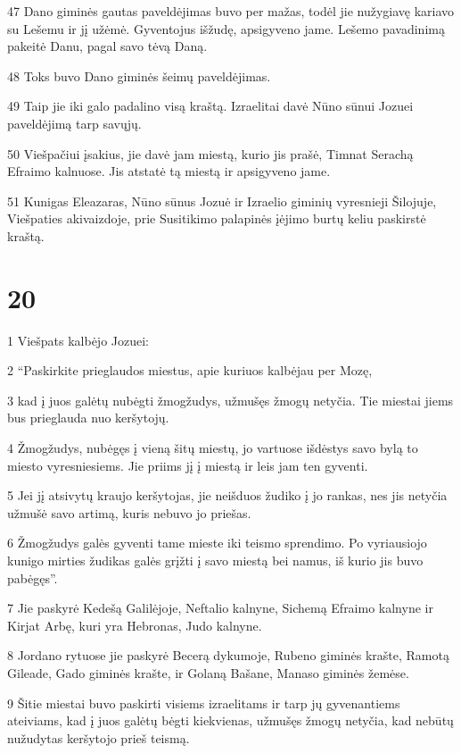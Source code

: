 \par 47 Dano giminės gautas paveldėjimas buvo per mažas, todėl jie nužygiavę kariavo su Lešemu ir jį užėmė. Gyventojus išžudę, apsigyveno jame. Lešemo pavadinimą pakeitė Danu, pagal savo tėvą Daną. 
\par 48 Toks buvo Dano giminės šeimų paveldėjimas. 
\par 49 Taip jie iki galo padalino visą kraštą. Izraelitai davė Nūno sūnui Jozuei paveldėjimą tarp savųjų. 
\par 50 Viešpačiui įsakius, jie davė jam miestą, kurio jis prašė, Timnat Serachą Efraimo kalnuose. Jis atstatė tą miestą ir apsigyveno jame. 
\par 51 Kunigas Eleazaras, Nūno sūnus Jozuė ir Izraelio giminių vyresnieji Šilojuje, Viešpaties akivaizdoje, prie Susitikimo palapinės įėjimo burtų keliu paskirstė kraštą.



\chapter{20}


\par 1 Viešpats kalbėjo Jozuei: 
\par 2 “Paskirkite prieglaudos miestus, apie kuriuos kalbėjau per Mozę, 
\par 3 kad į juos galėtų nubėgti žmogžudys, užmušęs žmogų netyčia. Tie miestai jiems bus prieglauda nuo keršytojų. 
\par 4 Žmogžudys, nubėgęs į vieną šitų miestų, jo vartuose išdėstys savo bylą to miesto vyresniesiems. Jie priims jį į miestą ir leis jam ten gyventi. 
\par 5 Jei jį atsivytų kraujo keršytojas, jie neišduos žudiko į jo rankas, nes jis netyčia užmušė savo artimą, kuris nebuvo jo priešas. 
\par 6 Žmogžudys galės gyventi tame mieste iki teismo sprendimo. Po vyriausiojo kunigo mirties žudikas galės grįžti į savo miestą bei namus, iš kurio jis buvo pabėgęs”. 
\par 7 Jie paskyrė Kedešą Galilėjoje, Neftalio kalnyne, Sichemą Efraimo kalnyne ir Kirjat Arbę, kuri yra Hebronas, Judo kalnyne. 
\par 8 Jordano rytuose jie paskyrė Becerą dykumoje, Rubeno giminės krašte, Ramotą Gileade, Gado giminės krašte, ir Golaną Bašane, Manaso giminės žemėse. 
\par 9 Šitie miestai buvo paskirti visiems izraelitams ir tarp jų gyvenantiems ateiviams, kad į juos galėtų bėgti kiekvienas, užmušęs žmogų netyčia, kad nebūtų nužudytas keršytojo prieš teismą.



